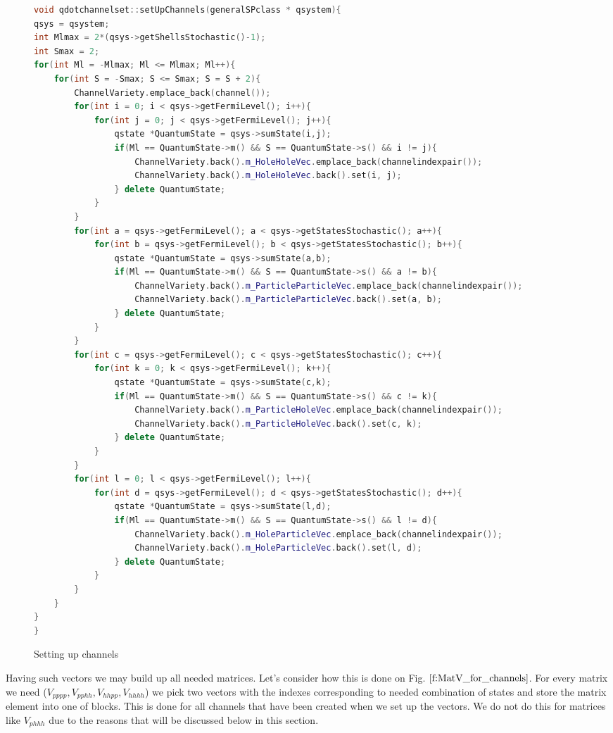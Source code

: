 \documentclass[twoside,english]{uiofysmaster}
\theoremstyle{definition}
\begin{document}
\begin{figure}
\begin{lstlisting}[language=C++]
void qdotchannelset::setUpChannels(generalSPclass * qsystem){
qsys = qsystem;
int Mlmax = 2*(qsys->getShellsStochastic()-1);
int Smax = 2;
for(int Ml = -Mlmax; Ml <= Mlmax; Ml++){
	for(int S = -Smax; S <= Smax; S = S + 2){
		ChannelVariety.emplace_back(channel());
		for(int i = 0; i < qsys->getFermiLevel(); i++){
			for(int j = 0; j < qsys->getFermiLevel(); j++){
				qstate *QuantumState = qsys->sumState(i,j);
				if(Ml == QuantumState->m() && S == QuantumState->s() && i != j){
					ChannelVariety.back().m_HoleHoleVec.emplace_back(channelindexpair());
					ChannelVariety.back().m_HoleHoleVec.back().set(i, j);
				} delete QuantumState;
			}
		}
		for(int a = qsys->getFermiLevel(); a < qsys->getStatesStochastic(); a++){
			for(int b = qsys->getFermiLevel(); b < qsys->getStatesStochastic(); b++){
				qstate *QuantumState = qsys->sumState(a,b);
				if(Ml == QuantumState->m() && S == QuantumState->s() && a != b){
					ChannelVariety.back().m_ParticleParticleVec.emplace_back(channelindexpair());
					ChannelVariety.back().m_ParticleParticleVec.back().set(a, b);
				} delete QuantumState;
			}
		}
		for(int c = qsys->getFermiLevel(); c < qsys->getStatesStochastic(); c++){
			for(int k = 0; k < qsys->getFermiLevel(); k++){
				qstate *QuantumState = qsys->sumState(c,k);
				if(Ml == QuantumState->m() && S == QuantumState->s() && c != k){
					ChannelVariety.back().m_ParticleHoleVec.emplace_back(channelindexpair());
					ChannelVariety.back().m_ParticleHoleVec.back().set(c, k);
				} delete QuantumState;
			}
		}
		for(int l = 0; l < qsys->getFermiLevel(); l++){			
			for(int d = qsys->getFermiLevel(); d < qsys->getStatesStochastic(); d++){
				qstate *QuantumState = qsys->sumState(l,d);
				if(Ml == QuantumState->m() && S == QuantumState->s() && l != d){
					ChannelVariety.back().m_HoleParticleVec.emplace_back(channelindexpair());
					ChannelVariety.back().m_HoleParticleVec.back().set(l, d);
				} delete QuantumState;
			}
		}
	}
}
}

\end{lstlisting}
\caption{Setting up channels} \label{f:vectors_for_channels}
\end{figure}


Having such vectors we may build up all needed matrices. Let's consider how this is done on Fig.  $\ref{f:MatV_for_channels}$. For every matrix we need ($V_{pppp}, V_{pphh},V_{hhpp}, V_{hhhh}$) we pick two vectors with the indexes corresponding to needed combination of states and store the matrix element into one of blocks. This is done for all channels that have been created when we set up the vectors. We do not do this for matrices like $V_{phhh}$ due to the reasons that will be discussed below in this section.\\
\end{document}
